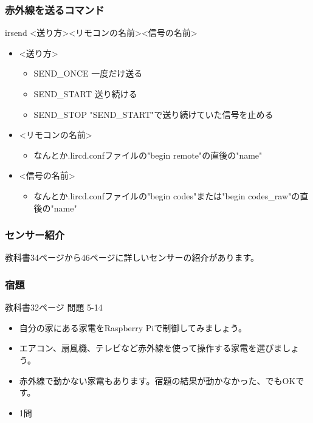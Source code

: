 \begin{frame}
    \frametitle{赤外線を送るコマンド}
    irsend \textless 送り方\textgreater \textless リモコンの名前\textgreater \textless 信号の名前\textgreater

    \begin{itemize}
        \item \textless 送り方\textgreater
        \begin{itemize}
            \item SEND\_ONCE 一度だけ送る
            \item SEND\_START 送り続ける
            \item SEND\_STOP "SEND\_START"で送り続けていた信号を止める
        \end{itemize}
        \item \textless リモコンの名前\textgreater
        \begin{itemize}
            \item なんとか.lircd.confファイルの"begin remote"の直後の"name"
        \end{itemize}
        \item \textless 信号の名前\textgreater
        \begin{itemize}
            \item なんとか.lircd.confファイルの"begin codes"または"begin codes\_raw"の直後の"name"
        \end{itemize}
    \end{itemize}
\end{frame}

\begin{frame}
    \frametitle{センサー紹介}
    教科書34ページから46ページに詳しいセンサーの紹介があります。
\end{frame}

\begin{frame}
    \frametitle{宿題}
    教科書32ページ 問題 5-14
    \begin{itemize}
        \item 自分の家にある家電をRaspberry Piで制御してみましょう。
        \item エアコン、扇風機、テレビなど赤外線を使って操作する家電を選びましょう。
        \item 赤外線で動かない家電もあります。宿題の結果が動かなかった、でもOKです。
        \item 1問
    \end{itemize}
\end{frame}